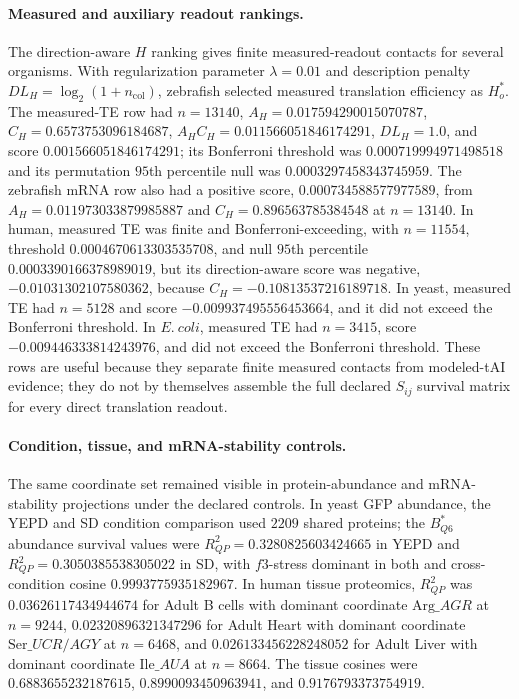 \paragraph{Measured and auxiliary readout rankings.}
The direction-aware $H$ ranking gives finite measured-readout contacts for several organisms.  With regularization parameter $\lambda=0.01$ and description penalty $DL_H=\log_2(1+n_{\mathrm{col}})$, zebrafish selected measured translation efficiency as $H^*_o$.  The measured-TE row had $n=13140$, $A_H=0.017594290015070787$, $C_H=0.6573753096184687$, $A_HC_H=0.011566051846174291$, $DL_H=1.0$, and score $0.001566051846174291$; its Bonferroni threshold was $0.000719994971498518$ and its permutation $95$th percentile null was $0.0003297458343745959$.  The zebrafish mRNA row also had a positive score, $0.000734588577977589$, from $A_H=0.011973033879985887$ and $C_H=0.896563785384548$ at $n=13140$.  In human, measured TE was finite and Bonferroni-exceeding, with $n=11554$, threshold $0.0004670613303535708$, and null $95$th percentile $0.0003390166378989019$, but its direction-aware score was negative, $-0.01031302107580362$, because $C_H=-0.10813537216189718$.  In yeast, measured TE had $n=5128$ and score $-0.009937495556453664$, and it did not exceed the Bonferroni threshold.  In $E.\ coli$, measured TE had $n=3415$, score $-0.009446333814243976$, and did not exceed the Bonferroni threshold.  These rows are useful because they separate finite measured contacts from modeled-tAI evidence; they do not by themselves assemble the full declared $S_{ij}$ survival matrix for every direct translation readout.

\paragraph{Condition, tissue, and mRNA-stability controls.}
The same coordinate set remained visible in protein-abundance and mRNA-stability projections under the declared controls.  In yeast GFP abundance, the YEPD and SD condition comparison used $2209$ shared proteins; the $B^*_{Q6}$ abundance survival values were $R^2_{QP}=0.3280825603424665$ in YEPD and $R^2_{QP}=0.3050385538305022$ in SD, with $f3$-stress dominant in both and cross-condition cosine $0.9993775935182967$.  In human tissue proteomics, $R^2_{QP}$ was $0.03626117434944674$ for Adult B cells with dominant coordinate $\mathrm{Arg}\_AGR$ at $n=9244$, $0.02320896321347296$ for Adult Heart with dominant coordinate $\mathrm{Ser}\_{UCR/AGY}$ at $n=6468$, and $0.026133456228248052$ for Adult Liver with dominant coordinate $\mathrm{Ile}\_AUA$ at $n=8664$.  The tissue cosines were $0.6883655232187615$, $0.8990093450963941$, and $0.9176793373754919$.

